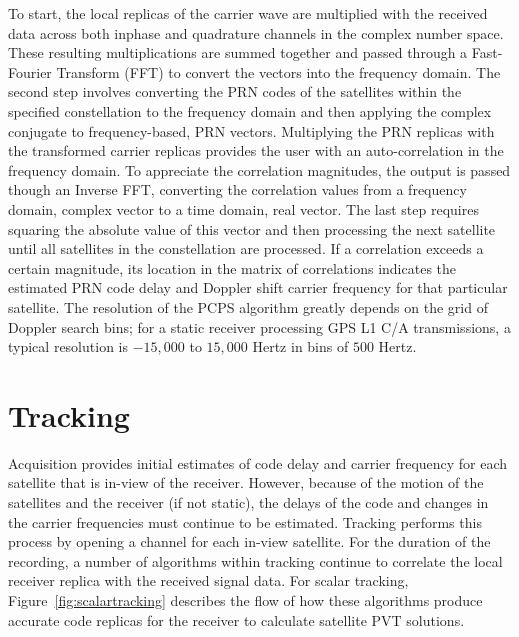 To start, the local replicas of the carrier wave are multiplied with the received data across both inphase and quadrature channels in the complex number space. These resulting multiplications are summed together and passed through a Fast-Fourier Transform (FFT) to convert the vectors into the frequency domain. The second step involves converting the PRN codes of the satellites within the specified constellation to the frequency domain and then applying the complex conjugate to frequency-based, PRN vectors. Multiplying the PRN replicas with the transformed carrier replicas provides the user with an auto-correlation in the frequency domain. To appreciate the correlation magnitudes, the output is passed though an Inverse FFT, converting the correlation values from a frequency domain, complex vector to a time domain, real vector. The last step requires squaring the absolute value of this vector and then processing the next satellite until all satellites in the constellation are processed. If a correlation exceeds a certain magnitude, its location in the matrix of correlations indicates the estimated PRN code delay and Doppler shift carrier frequency for that particular satellite. The resolution of the PCPS algorithm greatly depends on the grid of Doppler search bins; for a static receiver processing GPS L1 C/A transmissions, a typical resolution is \(-15,000\) to \(15,000\) Hertz in bins of \(500\) Hertz.

\section{Tracking}
Acquisition provides initial estimates of code delay and carrier frequency for each satellite that is in-view of the receiver. However, because of the motion of the satellites and the receiver (if not static), the delays of the code and changes in the carrier frequencies must continue to be estimated. Tracking performs this process by opening a channel for each in-view satellite. For the duration of the recording, a number of algorithms within tracking continue to correlate the local receiver replica with the received signal data. For scalar tracking, Figure~\ref{fig:scalartracking} describes the flow of how these algorithms produce accurate code replicas for the receiver to calculate satellite PVT solutions.

